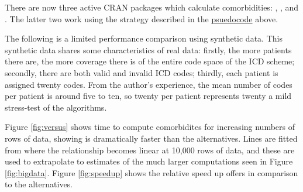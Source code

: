 \documentclass[article]{jss}
\begin{document}
There are now three active CRAN packages which calculate comorbidities:
,  \citep{medicalriskpkg}, and
 \citep{comorbiditypkg}. The latter two work using the
strategy described in the \protect\hyperlink{pseudocode}{psuedocode}
above.

The following is a limited performance comparison using synthetic data.
This synthetic data shares some characteristics of real data: firstly,
the more patients there are, the more coverage there is of the entire
code space of the ICD scheme; secondly, there are both valid and invalid
ICD codes; thirdly, each patient is assigned twenty codes. From the
author's experience, the mean number of codes per patient is around five
to ten, so twenty per patient represents twenty a mild stress-test of
the algorithms.

Figure \ref{fig:versus} shows time to compute comorbidites for
increasing numbers of rows of data, showing  is dramatically
faster than the alternatives. Lines are fitted from where the
relationship becomes linear at 10,000 rows of data, and these are used
to extrapolate to estimates of the much larger computations seen in
Figure \ref{fig:bigdata}. Figure \ref{fig:speedup} shows the relative
speed up  offers in comparison to the alternatives.
\end{document}
